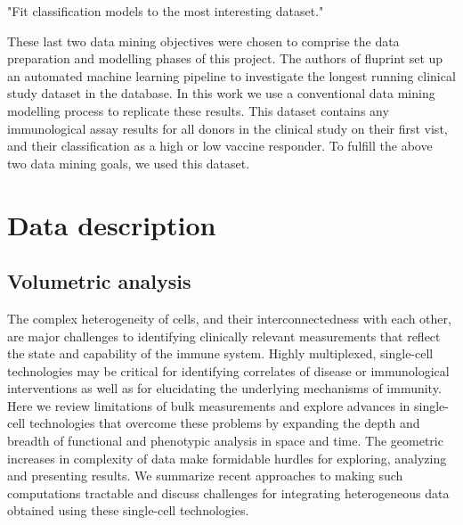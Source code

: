 \begin{displayquote}
"Fit classification models to the most interesting dataset."
\end{displayquote}

These last two data mining objectives were chosen to comprise the data
preparation and modelling phases of this project. The authors of fluprint set
up an automated machine learning pipeline to investigate the longest running
clinical study dataset in the database. In this work we use a conventional data
mining modelling process to replicate these results. This dataset contains any
immunological assay results for all donors in the clinical study on their first
vist, and their classification as a high or low vaccine responder. To fulfill
the above two data mining goals, we used this dataset.

\section{Data description}

\subsection{Volumetric analysis}

\citep{chattopadhyaySinglecellTechnologiesMonitoring2014}
The complex heterogeneity of cells, and their interconnectedness with each
other, are major challenges to identifying clinically relevant measurements
that reflect the state and capability of the immune system. Highly multiplexed,
single-cell technologies may be critical for identifying correlates of disease
or immunological interventions as well as for elucidating the underlying
mechanisms of immunity. Here we review limitations of bulk measurements and
explore advances in single-cell technologies that overcome these problems by
expanding the depth and breadth of functional and phenotypic analysis in space
and time. The geometric increases in complexity of data make formidable hurdles
for exploring, analyzing and presenting results. We summarize recent approaches
to making such computations tractable and discuss challenges for integrating
heterogeneous data obtained using these single-cell technologies.

